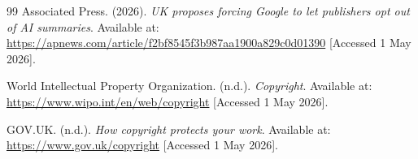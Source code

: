 \documentclass[11pt,a4paper]{article}
\begin{document}
\begin{thebibliography}{99}
Associated Press. (2026).
\textit{UK proposes forcing Google to let publishers opt out of AI summaries}.
Available at: \url{https://apnews.com/article/f2bf8545f3b987aa1900a829c0d01390}
[Accessed 1 May 2026].


World Intellectual Property Organization. (n.d.).
\textit{Copyright}.
Available at: \url{https://www.wipo.int/en/web/copyright}
[Accessed 1 May 2026].


GOV.UK. (n.d.).
\textit{How copyright protects your work}.
Available at: \url{https://www.gov.uk/copyright}
[Accessed 1 May 2026].



\end{thebibliography}
\end{document}
